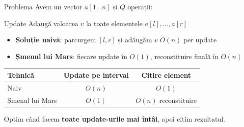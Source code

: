 ﻿\documentclass{beamer}
\begin{document}
\begin{frame}[shrink]{Problema}
  Avem un vector $a[1 \ldots n]$ și $Q$ operații:
  \begin{block}{Update}
    Adaugă valoarea $v$ la toate elementele $a[l], \ldots, a[r]$
  \end{block}

  \smallskip
  \begin{itemize}
    \item \textbf{Soluție naivă}: parcurgem $[l, r]$ și adăugăm $v$ \textemdash{} $O(n)$ per update
    \item \textbf{Șmenul lui Mars}: fiecare update în $O(1)$, reconstituire finală în $O(n)$
  \end{itemize}

  \smallskip
  \begin{center}
  \begin{tabular}{lcc}
    \toprule
    Tehnică & Update pe interval & Citire element \\
    \midrule
    Naiv & $O(n)$ & $O(1)$ \\
    Șmenul lui Mars & $O(1)$ & $O(n)$ reconstituire \\
    \bottomrule
  \end{tabular}
  \end{center}
  \medskip
  Optim când facem \textbf{toate update-urile mai întâi}, apoi citim rezultatul.
\end{frame}
\end{document}
